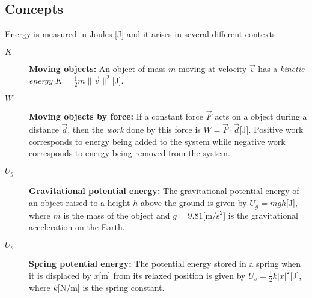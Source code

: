 \documentclass[letterpaper,9pt,journal]{IEEEtran}
\begin{document}
%

\vspace{-3mm}
\subsection{Concepts}
\label{ff4e01de0bd379280a0157bd102cc5f0}%

Energy is measured in Joules [J] and it arises in several different contexts:

\begin{description}
\item[$K$] \textbf{Moving objects:} An object of mass $m$ moving at velocity $\vec{v}$
    has a \emph{kinetic energy} $K = \frac{1}{2}m\|\vec{v}\|^2$[J].
\item[$W$] \textbf{Moving objects by force:} 
If a constant force $\vec{F}$ acts on a object 
    during a distance $\vec{d}$, then the \emph{work} done by this
    force is $W=\vec{F}\cdot \vec{d}$[J].
    Positive work corresponds to energy being added to the system while
    negative work corresponds to energy being removed from the system.
\item[$U_g$] 
  \textbf{Gravitational potential energy:} 
  The gravitational potential energy
    of an object raised to a height $h$ above the ground is
    given by $U_g = mgh$[J], where $m$ is the mass of the object
    and $g=9.81$[m/s$^2$] is the gravitational acceleration on the Earth.
\item[$U_s$]
  \textbf{Spring potential energy:}
  The potential energy stored in a spring
    when it is displaced by $x$[m] from its relaxed position 
    is given by $U_{s} = \frac{1}{2}k|x|^2$[J],
    where $k$[N/m] is the spring constant.
\end{description}
\end{document}
